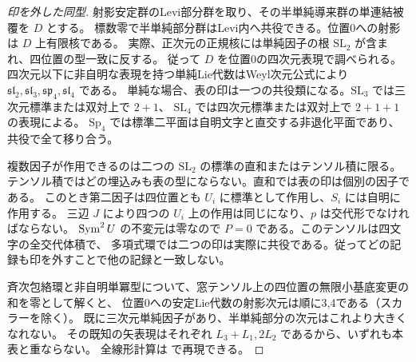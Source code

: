\begin{proof}[印を外した同型]
射影安定群のLevi部分群を取り、その半単純導来群の単連結被覆を $D$ とする。
標数零で半単純部分群はLevi内へ共役できる。位置0への射影は $D$ 上有限核である。
実際、正次元の正規核には単純因子の根 $\mathrm{SL}_2$ が含まれ、四位置の型一致に反する。
従って $D$ を位置0の四次元表現で調べられる。
四次元以下に非自明な表現を持つ単純Lie代数はWeyl次元公式により
$\mathfrak{sl}_2,\mathfrak{sl}_3,\mathfrak{sp}_4,\mathfrak{sl}_4$ である。
単純な場合、表の印は一つの共役類になる。$\mathrm{SL}_3$ では三次元標準または双対上で $2+1$、
$\mathrm{SL}_4$ では四次元標準または双対上で $2+1+1$ の表現による。
$\mathrm{Sp}_4$ では標準二平面は自明文字と直交する非退化平面であり、共役で全て移り合う。

複数因子が作用できるのは二つの $\mathrm{SL}_2$ の標準の直和またはテンソル積に限る。
テンソル積ではどの埋込みも表の型にならない。直和では表の印は個別の因子である。
このとき第二因子は四位置とも $U_i$ に標準として作用し、$S_i$ には自明に作用する。
三辺 $J$ により四つの $U_i$ 上の作用は同じになり、$p$ は交代形でなければならない。
$\operatorname{Sym}^2 U$ の不変元は零なので $P=0$ である。このテンソルは四文字の全交代体積で、
多項式環では二つの印は実際に共役である。従ってどの記録も印を外すことで他の記録と一致しない。

斉次包絡環と非自明単冪型について、窓テンソル上の四位置の無限小基底変更の和を零として解くと、
位置0への安定Lie代数の射影次元は順に3,4である（スカラーを除く）。
既に三次元単純因子があり、半単純部分の次元はこれより大きくなれない。
その既知の矢表現はそれぞれ $L_3+L_1,2L_2$ であるから、いずれも本表と重ならない。
全線形計算は  で再現できる。
\end{proof}

